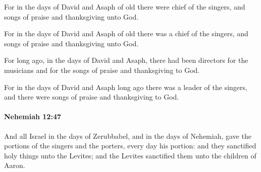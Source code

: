 			For in the days of David and Asaph of old there were chief of the singers, and songs of praise and thanksgiving unto God.

			\begin{versebox}
					\item[BHS] 
					\item[LXX] 
					\item[ASV] For in the days of David and Asaph of old there was a chief of the singers, and songs of praise and thanksgiving unto God.
					\item[NIV] For long ago, in the days of David and Asaph, there had been directors for the musicians and for the songs of praise and thanksgiving to God.
					\item[NRSV] For in the days of David and Asaph long ago there was a leader of the singers, and there were songs of praise and thanksgiving to God.
			\end{versebox}

		\paragraph{Nehemiah 12:47} %
			\label{NEHEMIAH-12-47}

			And all Israel in the days of Zerubbabel, and in the days of Nehemiah, gave the portions of the singers and the porters, every day his portion: and they sanctified holy things unto the Levites; and the Levites sanctified them unto the children of Aaron.

